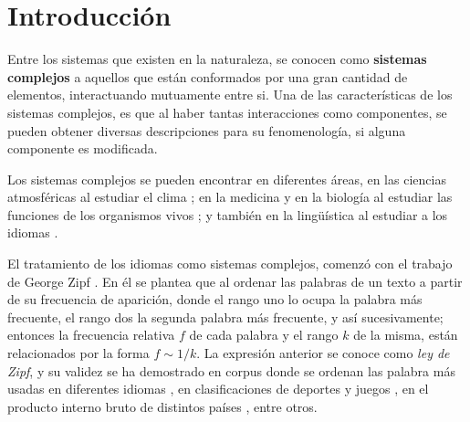 \chapter{Introducción}

Entre los sistemas que existen en la naturaleza, se conocen como  \textbf{sistemas complejos} a aquellos que  están conformados por una gran cantidad de elementos, interactuando mutuamente entre si. Una de las características de los sistemas complejos, es que al haber tantas interacciones como componentes, se pueden obtener diversas descripciones para su fenomenología,  si alguna componente es modificada.




Los sistemas complejos se pueden encontrar en diferentes áreas, en las ciencias atmosféricas al estudiar el clima \cite{complex_climate};  en la medicina y en la biología al estudiar las funciones de los organismos vivos  \cite{complex_medicine}; y también en la lingüística al estudiar a los idiomas  \cite{complex_language} .

El tratamiento de los idiomas como sistemas complejos, comenzó con el trabajo de George Zipf \cite{zipf}. En él se plantea que al ordenar las palabras de un texto a partir de su frecuencia de aparición, donde el rango uno lo ocupa la palabra más frecuente, el rango dos la segunda palabra más frecuente, y así sucesivamente; entonces la frecuencia relativa $f$ de cada palabra y el rango $k$ de la misma, están relacionados por la forma $f\sim1/k$. La expresión anterior se conoce como \textit{ley de Zipf}, y su validez se ha demostrado en corpus donde se ordenan las palabra más usadas en diferentes idiomas \cite{tesis.sergio}, en clasificaciones de deportes y juegos \cite{epj}, en el producto interno bruto de distintos países \cite{zipf_gdp}, entre otros. 

